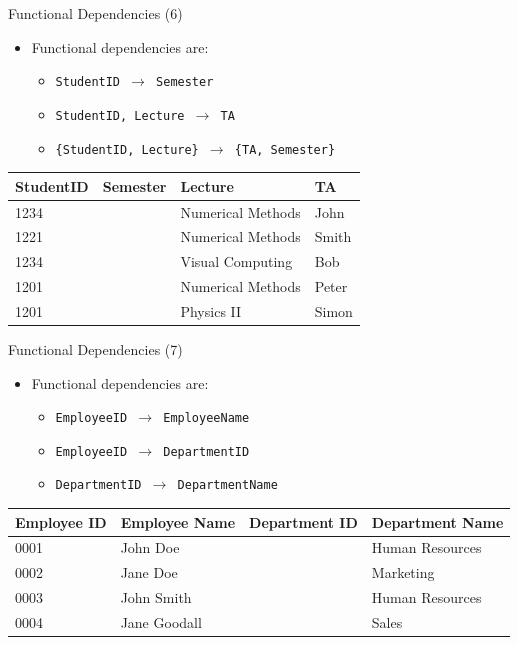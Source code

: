 \documentclass[aspectratio=169, xcolor=dvipsnames]{beamer}
\begin{document}
\begin{frame}{Functional Dependencies (6)}
    \begin{itemize}[<+->]
        \item Functional dependencies are:
        \begin{itemize}
            \item[$\triangleright$] \texttt{StudentID $\rightarrow$ Semester}
            \item[$\triangleright$] \texttt{StudentID, Lecture $\rightarrow$ TA}
            \item[$\triangleright$] \texttt{\{StudentID, Lecture\} $\rightarrow$ \{TA, Semester\}}
        \end{itemize}
    \end{itemize}
    \begin{center}
    \begin{tabular}{|l|l|l|l|}
    \hline
    \textbf{StudentID} & \textbf{Semester} & \textbf{Lecture} & \textbf{TA} \\ \hline
    1234 & & Numerical Methods & John \\ 
    1221 & & Numerical Methods & Smith \\ 
    1234 & & Visual Computing & Bob \\ 
    1201 & & Numerical Methods & Peter \\ 
    1201 & & Physics II & Simon \\ \hline
    \end{tabular}
    \end{center}
\end{frame}

\begin{frame}{Functional Dependencies (7)}
    \begin{itemize}[<+->]
        \item Functional dependencies are:
        \begin{itemize}
            \item[$\triangleright$] \texttt{EmployeeID $\rightarrow$ EmployeeName}
            \item[$\triangleright$] \texttt{EmployeeID $\rightarrow$ DepartmentID}
            \item[$\triangleright$] \texttt{DepartmentID $\rightarrow$ DepartmentName}
        \end{itemize}
    \end{itemize}
    \begin{center}
    \begin{tabular}{|l|l|l|l|}
    \hline
    \textbf{Employee ID} & \textbf{Employee Name} & \textbf{Department ID} & \textbf{Department Name} \\ \hline
    0001 & John Doe & & Human Resources \\ 
    0002 & Jane Doe & & Marketing \\ 
    0003 & John Smith & & Human Resources \\ 
    0004 & Jane Goodall & & Sales \\ \hline
    \end{tabular}
    \end{center}
\end{frame}
\end{document}
